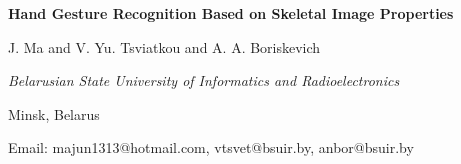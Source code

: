 \documentclass{article}
\begin{document}
\begin{newpage}
\begin{center}
\fontsize{20}{7}\selectfont \textbf{Hand Gesture Recognition Based on Skeletal Image Properties}

\vspace{0.1cm}\fontsize{12}{7}\selectfont J. Ma and V. Yu. Tsviatkou and A. A. Boriskevich

\vspace{0.1cm} \textit{Belarusian State University of Informatics and Radioelectronics}

Minsk, Belarus

\fontsize{11}{7}\selectfont Email: majun1313@hotmail.com, vtsvet@bsuir.by, anbor@bsuir.by
\end{center}
\end{newpage}
\end{document}
